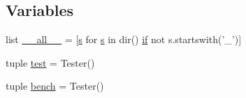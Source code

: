 \subsection*{Variables}
\begin{DoxyCompactItemize}
\item 
list \hyperlink{namespacescipy_1_1sparse_a012f619dd03343fa320a2b36b9710de3}{\+\_\+\+\_\+all\+\_\+\+\_\+} = \mbox{[}\hyperlink{indexexpr_8h_ae024b0db549122b44c349ae28ec990dc}{s} for \hyperlink{indexexpr_8h_ae024b0db549122b44c349ae28ec990dc}{s} in dir() \hyperlink{minmax_8h_a30a0ee9fee303f01d9c5e6f669e0dfe9}{if} not s.\+startswith('\+\_\+')\mbox{]}
\item 
tuple \hyperlink{namespacescipy_1_1sparse_a02160871edc624a6129587f1dbe86093}{test} = Tester()
\item 
tuple \hyperlink{namespacescipy_1_1sparse_a5e85f04fbdf989231a00354a0ef449a8}{bench} = Tester()
\end{DoxyCompactItemize}


